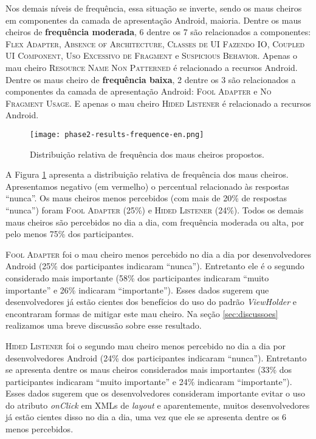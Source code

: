 Nos demais níveis de frequência, essa situação se inverte, sendo os maus cheiros em componentes da camada de apresentação Android, maioria. Dentre os maus cheiros de \textbf{\small frequência moderada}, 6 dentre os 7 são relacionados a componentes: \textsc{\small Flex Adapter}, \textsc{\small Absence of Architecture}, \textsc{\small Classes de UI Fazendo IO}, \textsc{\small Coupled UI Component}, \textsc{\small Uso Excessivo de Fragment} e \textsc{\small Suspicious Behavior}. Apenas o mau cheiro \textsc{\small Resource Name Non Patterned} é relacionado a recursos Android. Dentre os maus cheiro de \textbf{\small frequência baixa}, 2 dentre os 3 são relacionados a componentes da camada de apresentação Android: \textsc{\small Fool Adapter} e \textsc{\small No Fragment Usage}. E apenas o mau cheiro \textsc{\small Hided Listener} é relacionado a recursos Android.

\begin{figure}
  \centering
  \texttt{[image: phase2-results-frequence-en.png]}
  \caption{Distribuição relativa de frequência dos maus cheiros propostos.}
  \label{fig:phase2-survey-frequence}
\end{figure}

A Figura \ref{fig:phase2-survey-frequence} apresenta a distribuição relativa de frequência dos maus cheiros. Apresentamos negativo (em vermelho) o percentual relacionado às respostas ``nunca''. Os maus cheiros menos percebidos (com mais de 20\% de respostas ``nunca'') foram \textsc{\small Fool Adapter} (25\%) e \textsc{\small Hided Listener} (24\%). Todos os demais maus cheiros são percebidos no dia a dia, com frequência moderada ou alta, por pelo menos 75\% dos participantes.

\textsc{\small Fool Adapter} foi o mau cheiro menos percebido no dia a dia por desenvolvedores Android (25\% dos participantes indicaram ``nunca''). Entretanto ele é o segundo considerado mais importante (58\% dos participantes indicaram ``muito importante'' e 26\% indicaram ``importante''). Esses dados sugerem que desenvolvedores já estão cientes dos benefícios do uso do padrão \textit{ViewHolder} \cite{AluraViewHolder} e encontraram formas de mitigar este mau cheiro. Na seção \ref{sec:discussoes} realizamos uma breve discussão sobre esse resultado.

\textsc{\small Hided Listener} foi o segundo mau cheiro menos percebido no dia a dia por desenvolvedores Android (24\% dos participantes indicaram ``nunca''). Entretanto se apresenta dentre os maus cheiros considerados mais importantes (33\% dos participantes indicaram ``muito importante'' e 24\% indicaram ``importante''). Esses dados sugerem que os desenvolvedores consideram importante evitar o uso do atributo \textit{onClick} em XMLs de \textit{layout} e aparentemente, muitos desenvolvedores já estão cientes disso no dia a dia, uma vez que ele se apresenta dentre os 6 menos percebidos. \\


